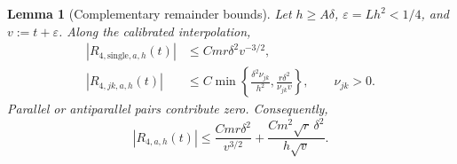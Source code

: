 \documentclass[11pt,letterpaper]{article}
\newtheorem{lemma}{Lemma}
\theoremstyle{remark}
\begin{document}
\begin{lemma}[Complementary remainder bounds]
\label{lem:cap-remainder}
Let $h\ge A\delta$, $\varepsilon=Lh^2<1/4$, and
$v:=t+\varepsilon$. Along the calibrated interpolation,
\begin{align}
 |R_{4,\mathrm{single},a,h}(t)|
 &\le Cmr\delta^2v^{-3/2},
 \label{cap:single}\\
 |R_{4,jk,a,h}(t)|
 &\le C\min\left\{\frac{\delta^2\nu_{jk}}{h^2},
                    \frac{r\delta^2}{\nu_{jk}v}\right\},
 \qquad \nu_{jk}>0.
 \label{cap:pair}
\end{align}
Parallel or antiparallel pairs contribute zero. Consequently,
\begin{equation}
 |R_{4,a,h}(t)|
 \le \frac{Cmr\delta^2}{v^{3/2}}
       +\frac{Cm^2\sqrt r\,\delta^2}{h\sqrt v}.
 \label{cap:complementary}
\end{equation}
\end{lemma}
\end{document}
